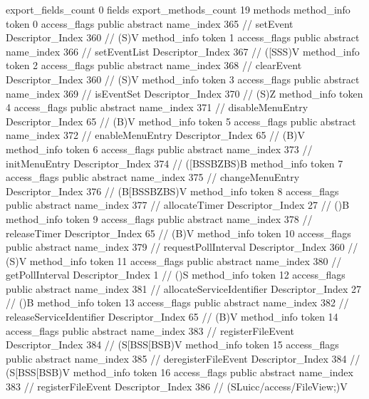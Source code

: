 {{{{			}
			export_fields_count	0
			fields {
			}
			export_methods_count	19
			methods {
				method_info {
					token	0
					access_flags	public abstract
					name_index	365		// setEvent
					Descriptor_Index	360		// (S)V
				}
				method_info {
					token	1
					access_flags	public abstract
					name_index	366		// setEventList
					Descriptor_Index	367		// ([SSS)V
				}
				method_info {
					token	2
					access_flags	public abstract
					name_index	368		// clearEvent
					Descriptor_Index	360		// (S)V
				}
				method_info {
					token	3
					access_flags	public abstract
					name_index	369		// isEventSet
					Descriptor_Index	370		// (S)Z
				}
				method_info {
					token	4
					access_flags	public abstract
					name_index	371		// disableMenuEntry
					Descriptor_Index	65		// (B)V
				}
				method_info {
					token	5
					access_flags	public abstract
					name_index	372		// enableMenuEntry
					Descriptor_Index	65		// (B)V
				}
				method_info {
					token	6
					access_flags	public abstract
					name_index	373		// initMenuEntry
					Descriptor_Index	374		// ([BSSBZBS)B
				}
				method_info {
					token	7
					access_flags	public abstract
					name_index	375		// changeMenuEntry
					Descriptor_Index	376		// (B[BSSBZBS)V
				}
				method_info {
					token	8
					access_flags	public abstract
					name_index	377		// allocateTimer
					Descriptor_Index	27		// ()B
				}
				method_info {
					token	9
					access_flags	public abstract
					name_index	378		// releaseTimer
					Descriptor_Index	65		// (B)V
				}
				method_info {
					token	10
					access_flags	public abstract
					name_index	379		// requestPollInterval
					Descriptor_Index	360		// (S)V
				}
				method_info {
					token	11
					access_flags	public abstract
					name_index	380		// getPollInterval
					Descriptor_Index	1		// ()S
				}
				method_info {
					token	12
					access_flags	public abstract
					name_index	381		// allocateServiceIdentifier
					Descriptor_Index	27		// ()B
				}
				method_info {
					token	13
					access_flags	public abstract
					name_index	382		// releaseServiceIdentifier
					Descriptor_Index	65		// (B)V
				}
				method_info {
					token	14
					access_flags	public abstract
					name_index	383		// registerFileEvent
					Descriptor_Index	384		// (S[BSS[BSB)V
				}
				method_info {
					token	15
					access_flags	public abstract
					name_index	385		// deregisterFileEvent
					Descriptor_Index	384		// (S[BSS[BSB)V
				}
				method_info {
					token	16
					access_flags	public abstract
					name_index	383		// registerFileEvent
					Descriptor_Index	386		// (SLuicc/access/FileView;)V
}}}}}
